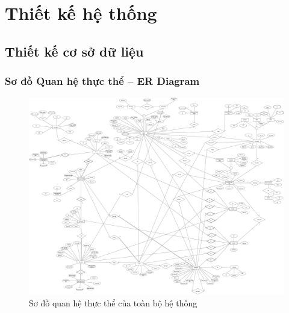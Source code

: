 \documentclass[12pt,a4paper]{article}
\begin{document}
    \section{Thiết kế hệ thống}

    \subsection{Thiết kế cơ sở dữ liệu}

    \subsubsection{Sơ đồ Quan hệ thực thể – ER Diagram}
    \begin{figure}[H]
        \centering \includegraphics[width=\textwidth]{Img/ERD/ERD.png}
        \caption{Sơ đồ quan hệ thực thể của toàn bộ hệ thống}
        \label{erd_all}
    \end{figure}
\end{document}
